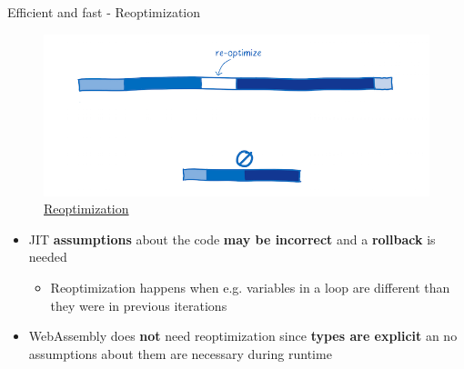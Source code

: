 \documentclass{beamer}
\begin{document}
\begin{frame}{Efficient and fast - Reoptimization}
    \begin{figure}
        \includegraphics[scale=0.2]{./images/re-optimize.png}
        \caption{\href{https://www.smashingmagazine.com/2017/05/abridged-cartoon-introduction-webassembly/}{Reoptimization}}
    \end{figure}
    \begin{itemize}
        \item JIT \textbf{assumptions} about the code \textbf{may be incorrect} and a \textbf{rollback} is needed
        \begin{itemize}
            \item Reoptimization happens when e.g. variables in a loop are different than they were in previous iterations
        \end{itemize}
        \item WebAssembly does \textbf{not} need reoptimization since \textbf{types are explicit} an no assumptions about them are necessary during runtime
    \end{itemize}
\end{frame}
\end{document}
